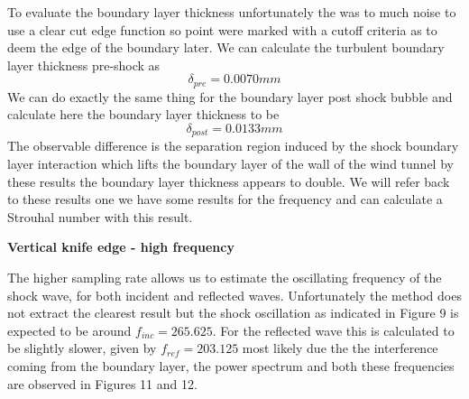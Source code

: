 \documentclass[a4paper,10pt,twoside]{article}
\begin{document}
\begin{multicols}{2}
To evaluate the boundary layer thickness unfortunately the was to much noise to use a clear cut edge function so point were marked with a cutoff criteria as to deem the edge of the boundary later. We can calculate the turbulent boundary layer thickness pre-shock as
\begin{equation}
    \delta_{pre} = 0.0070 mm
\end{equation}
We can do exactly the same thing for the boundary layer post shock bubble and calculate here the boundary layer thickness to be 
\begin{equation}
    \delta_{post} = 0.0133 mm
\end{equation}
The observable difference is the separation region induced by the shock boundary layer interaction which lifts the boundary layer of the wall of the wind tunnel by these results the boundary layer thickness appears to double. We will refer back to these results one we have some results for the frequency and can calculate a Strouhal number with this result. \par





\vspace{5mm}
\centerline{\textbf{Vertical knife edge - high frequency}}
\vspace{5mm}





The higher sampling rate allows us to estimate the oscillating frequency of the shock wave, for both incident and reflected waves. Unfortunately the method does not extract the clearest result but the shock oscillation as indicated in Figure 9 is expected to be around $f_{inc} = 265.625$. For the reflected wave this is calculated to be slightly slower, given by $f_{ref} = 203.125$ most likely due the the interference coming from the boundary layer, the power spectrum and both these frequencies are observed in Figures 11 and 12. \par 




\end{multicols}
\end{document}
